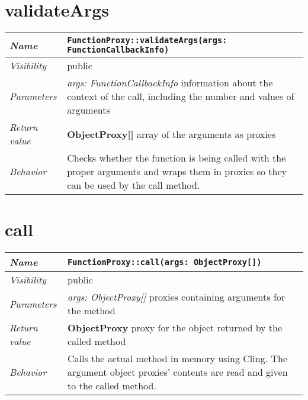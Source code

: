 \section{validateArgs}
\begin{longtable}{p{3cm} @{\hskip 1cm} p{12cm}}
	\hline

	\textit{Name} & \texttt{FunctionProxy::validateArgs(args: FunctionCallbackInfo)}\\
	\hline

	\textit{Visibility} & public\\
	\hline

	\textit{Parameters} & \textit{args: FunctionCallbackInfo} information about the context of the call, including the number and values of arguments\\
	\hline

	\textit{Return value} & \textbf{ObjectProxy[]} array of the arguments as proxies\\
	\hline

	\textit{Behavior} & Checks whether the function is being called with the proper arguments and wraps them in proxies so they can be used by the call method.\\
	\hline

\end{longtable}
\pagebreak

\section{call}
\begin{longtable}{p{3cm} @{\hskip 1cm} p{12cm}}
	\hline

	\textit{Name} & \texttt{FunctionProxy::call(args: ObjectProxy[])}\\
	\hline

	\textit{Visibility} & public\\
	\hline

	\textit{Parameters} & \textit{args: ObjectProxy[]} proxies containing arguments for the method\\
	\hline

	\textit{Return value} & \textbf{ObjectProxy} proxy for the object returned by the called method\\
	\hline

	\textit{Behavior} & Calls the actual method in memory using Cling. The argument object proxies' contents are read and given to the called method.\\
	\hline

\end{longtable}
\pagebreak
